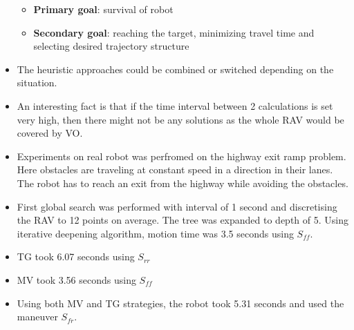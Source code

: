 \documentclass[12pt]{article}
\begin{document}
\begin{itemize}
        \begin{itemize}
            \item \textbf{Primary goal}: survival of robot
            \item \textbf{Secondary goal}: reaching the target, minimizing travel time and selecting desired trajectory structure
        \end{itemize} 
    \item The heuristic approaches could be combined or switched depending on the situation.
    \item An interesting fact is that if the time interval between 2 calculations is set very high, then there might not be any solutions as the whole RAV would be covered by VO\@.
    \item Experiments on real robot was perfromed on the highway exit ramp problem. Here obstacles are traveling at constant speed in a direction in their lanes. The robot has to reach an exit from the highway while avoiding the obstacles.
    \item First global search was performed with interval of 1 second and discretising the RAV to 12 points on average. The tree was expanded to depth of 5. Using iterative deepening algorithm, motion time was 3.5 seconds using $S_{ff}$.
    \item TG took 6.07 seconds using $S_{rr}$
    \item MV took 3.56 seconds using $S_{ff}$
    \item Using both MV and TG strategies, the robot took 5.31 seconds and used the maneuver $S_{fr}$. 
\end{itemize}
\end{document}
